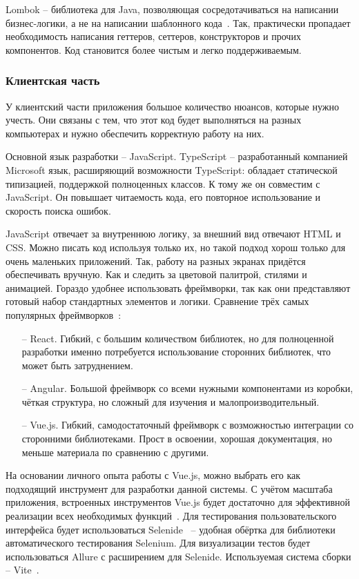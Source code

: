\documentclass[a4paper,article]{article}
\begin{document}
\begin{sloppypar}
    Lombok -- библиотека для Java, позволяющая сосредотачиваться на написании бизнес-логики, а не на написании шаблонного кода~\cite{lombok}. Так, практически пропадает необходимость написания геттеров, сеттеров, конструкторов и прочих компонентов. Код становится более чистым и легко поддерживаемым.

    \subsubsection{Клиентская часть}\label{Реализация. Выбор. Клиентская часть}

    У клиентский части приложения большое количество нюансов, которые нужно учесть. Они связаны с тем, что этот код будет выполняться на разных компьютерах и нужно обеспечить корректную работу на них.

    Основной язык разработки -- JavaScript. TypeScript -- разработанный компанией Microsoft язык, расширяющий возможности TypeScript: обладает статической типизацией, поддержкой полноценных классов. К тому же он совместим с JavaScript. Он повышает читаемость кода, его повторное использование и скорость поиска ошибок.

    JavaScript отвечает за внутреннюю логику, за внешний вид отвечают HTML и CSS. Можно писать код используя только их, но такой подход хорош только для очень маленьких приложений. Так, работу на разных экранах придётся обеспечивать вручную. Как и следить за цветовой палитрой, стилями и анимацией. Гораздо удобнее использовать фреймворки, так как они представляют готовый набор стандартных элементов и логики. Сравнение трёх самых популярных фреймворков~\cite{comparejs}:

    \begin{itemize}[nolistsep]
        \item[--] React. Гибкий, с большим количеством библиотек, но для полноценной разработки именно потребуется использование сторонних библиотек, что может быть затруднением.
        \item[--] Angular. Большой фреймворк со всеми нужными компонентами из коробки, чёткая структура, но сложный для изучения и малопроизводительный.
        \item[--] Vue.js. Гибкий, самодостаточный фреймворк с возможностью интеграции со сторонними библиотеками. Прост в освоении, хорошая документация, но меньше материала по сравнению с другими.
    \end{itemize}

    На основании личного опыта работы с Vue.js, можно выбрать его как подходящий инструмент для разработки данной системы. С учётом масштаба приложения, встроенных инструментов Vue.js будет достаточно для эффективной реализации всех необходимых функций~\cite{vuejs}. Для тестирования пользовательского интерфейса будет использоваться Selenide~\cite{selenide} -- удобная обёртка для библиотеки автоматического тестирования Selenium. Для визуализации тестов будет использоваться Allure с расширением для Selenide. Используемая система сборки -- Vite~\cite{vite}.


\end{sloppypar}
\end{document}
